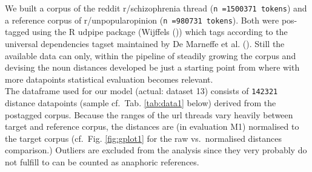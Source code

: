 \documentclass[
  12pt,
  oneside]{book}
\begin{document}
We built a corpus of the reddit r/schizophrenia thread (\texttt{n\ =1500371\ tokens}) and a reference corpus of r/unpopularopinion (\texttt{n\ =980731\ tokens}). Both were pos-tagged using the R udpipe package (Wijffels ()) which tags according to the universal dependencies tagset maintained by De Marneffe et al. (). Still the available data can only, within the pipeline of steadily growing the corpus and devising the noun distances developed be just a starting point from where with more datapoints statistical evaluation becomes relevant.\\
The dataframe used for our model (actual: dataset 13) consists of \texttt{142321} distance datapoints (sample cf.~Tab. \ref{tab:data1} below) derived from the postagged corpus. Because the ranges of the url threads vary heavily between target and reference corpus, the distances are (in evaluation M1) normalised to the target corpus (cf.~Fig. \ref{fig:gplot1} for the raw vs.~normalised distances comparison.) Outliers are excluded from the analysis since they very probably do not fulfill to can be counted as anaphoric references.
\end{document}
